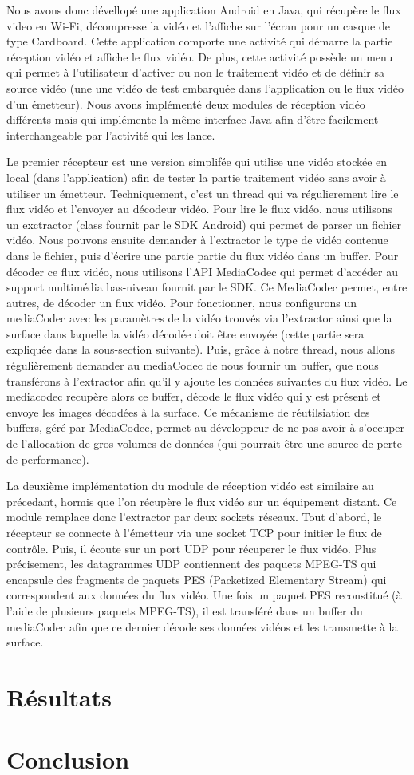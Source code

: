 \documentclass[11pt,a4paper]{article}
\begin{document}
\bigbreak
Nous avons donc dévellopé une application Android en Java, qui récupère le flux video en Wi-Fi, décompresse la vidéo et l'affiche sur l'écran pour un casque de type Cardboard.
Cette application comporte une activité qui démarre la partie réception vidéo et affiche le flux vidéo. De plus, cette activité possède un menu qui permet à l'utilisateur d'activer ou non le traitement vidéo et de définir sa source vidéo (une une vidéo de test embarquée dans l'application ou le flux vidéo d'un émetteur).
Nous avons implémenté deux modules de réception vidéo différents mais qui implémente la même interface Java afin d'être facilement interchangeable par l'activité qui les lance.

\bigbreak
Le premier récepteur est une version simplifée qui utilise une vidéo stockée en local (dans l'application) afin de tester la partie traitement vidéo sans avoir à utiliser un émetteur.
Techniquement, c'est un thread qui va régulierement lire le flux vidéo et l'envoyer au décodeur vidéo. 
Pour lire le flux vidéo, nous utilisons un exctractor (class fournit par le SDK Android) qui permet de parser un fichier vidéo. Nous pouvons ensuite demander à l'extractor le type de vidéo contenue dans le fichier, puis d'écrire une partie partie du flux vidéo dans un buffer.
Pour décoder ce flux vidéo, nous utilisons l'API MediaCodec qui permet d'accéder au support multimédia bas-niveau fournit par le SDK. Ce MediaCodec permet, entre autres, de décoder un flux vidéo.
Pour fonctionner, nous configurons un mediaCodec avec les paramètres de la vidéo trouvés via l'extractor ainsi que la surface dans laquelle la vidéo décodée doit être envoyée (cette partie sera expliquée dans la sous-section suivante).
Puis, grâce à notre thread, nous allons régulièrement demander au mediaCodec de nous fournir un buffer, que nous transférons à l'extractor afin qu'il y ajoute les données suivantes du flux vidéo.
Le mediacodec recupère alors ce buffer, décode le flux vidéo qui y est présent et envoye les images décodées à la surface.
Ce mécanisme de réutilsiation des buffers, géré par MediaCodec, permet au développeur de ne pas avoir à s'occuper de l'allocation de gros volumes de données (qui pourrait être une source de perte de performance). 

\bigbreak
La deuxième implémentation du module de réception vidéo est similaire au précedant, hormis que l'on récupère le flux vidéo sur un équipement distant.
Ce module remplace donc l'extractor par deux sockets réseaux.
Tout d'abord, le récepteur se connecte à l'émetteur via une socket TCP pour initier le flux de contrôle.
Puis, il écoute sur un port UDP pour récuperer le flux vidéo.
Plus précisement, les datagrammes UDP contiennent des paquets MPEG-TS qui encapsule des fragments de paquets PES (Packetized Elementary Stream) qui correspondent aux données du flux vidéo.
Une fois un paquet PES reconstitué (à l'aide de plusieurs paquets MPEG-TS), il est transféré dans un buffer du mediaCodec afin que ce dernier décode ses données vidéos et les transmette à la surface.

\section{Résultats}

\section{Conclusion}
\end{document}
